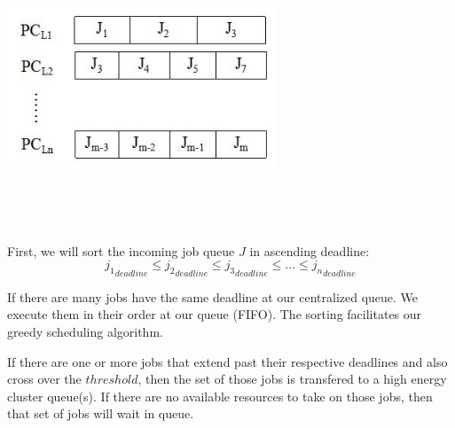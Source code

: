 \documentclass[conference]{IEEEtran}
\begin{document}
\includegraphics[width=8cm,height=8cm,keepaspectratio]{2.JPG}\\
\\First, we will sort the incoming job queue $J$ in ascending deadline:
$${j_1}_{deadline} \leq {j_2}_{deadline} \leq {j_3}_{deadline} \leq ... \leq {j_n}_{deadline}$$

If there are many jobs have the same deadline at our centralized queue. We execute them in their order at our queue (FIFO). The sorting facilitates our greedy scheduling algorithm.

If there are one or more jobs that extend past their respective deadlines and also cross over the $threshold$, then the set of those jobs is transfered to a high energy cluster queue(s). If there are no available resources to take on those jobs, then that set of jobs will wait in queue.
\end{document}
